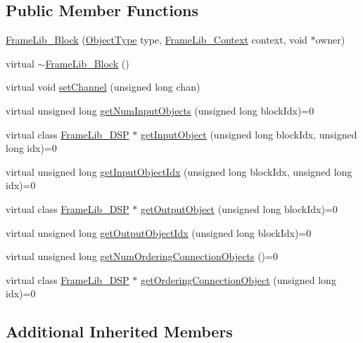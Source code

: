 \subsection*{Public Member Functions}
\begin{DoxyCompactItemize}
\item 
\hyperlink{class_frame_lib___block_a99b10eba9f8f598c6ffdebd4a493489d}{Frame\+Lib\+\_\+\+Block} (\hyperlink{_frame_lib___types_8h_a842c5e2e69277690b064bf363c017980}{Object\+Type} type, \hyperlink{class_frame_lib___context}{Frame\+Lib\+\_\+\+Context} context, void $\ast$owner)
\item 
virtual \hyperlink{class_frame_lib___block_a17c0048595334cb8d63abfcbb77c980d}{$\sim$\+Frame\+Lib\+\_\+\+Block} ()
\item 
virtual void \hyperlink{class_frame_lib___block_a730aaf9204244afd2c40da0c40bb1ba8}{set\+Channel} (unsigned long chan)
\item 
virtual unsigned long \hyperlink{class_frame_lib___block_ab16af33ec9eb40711590cb90a927706c}{get\+Num\+Input\+Objects} (unsigned long block\+Idx)=0
\item 
virtual class \hyperlink{class_frame_lib___d_s_p}{Frame\+Lib\+\_\+\+D\+SP} $\ast$ \hyperlink{class_frame_lib___block_a762b56f0e53163b7b4fabc90febc814e}{get\+Input\+Object} (unsigned long block\+Idx, unsigned long idx)=0
\item 
virtual unsigned long \hyperlink{class_frame_lib___block_a65748f72b840fd90bee87591446b9b50}{get\+Input\+Object\+Idx} (unsigned long block\+Idx, unsigned long idx)=0
\item 
virtual class \hyperlink{class_frame_lib___d_s_p}{Frame\+Lib\+\_\+\+D\+SP} $\ast$ \hyperlink{class_frame_lib___block_add0b4f01447203f0ffaecb59cfe2c271}{get\+Output\+Object} (unsigned long block\+Idx)=0
\item 
virtual unsigned long \hyperlink{class_frame_lib___block_ad9e6ffbcf895c3eedc9e9b9c17dd013c}{get\+Output\+Object\+Idx} (unsigned long block\+Idx)=0
\item 
virtual unsigned long \hyperlink{class_frame_lib___block_a4a3be26fea03fcea53ef482cda07de56}{get\+Num\+Ordering\+Connection\+Objects} ()=0
\item 
virtual class \hyperlink{class_frame_lib___d_s_p}{Frame\+Lib\+\_\+\+D\+SP} $\ast$ \hyperlink{class_frame_lib___block_a783373d2348b0d96b1c731041ba4fb0f}{get\+Ordering\+Connection\+Object} (unsigned long idx)=0
\end{DoxyCompactItemize}
\subsection*{Additional Inherited Members}



